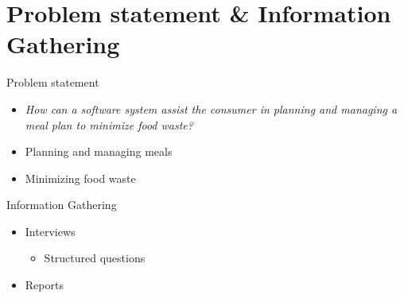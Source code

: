 \section{Problem statement \& Information Gathering} 
\begin{frame}{Problem statement}
    \begin{itemize}
        \item \textit{How can a software system assist the consumer in planning and managing a meal plan to minimize food waste?}
    \end{itemize}
        \begin{itemize}
            \item Planning and managing meals
            \item Minimizing food waste
        \end{itemize}
\end{frame}

\begin{frame}{Information Gathering}
    \begin{itemize}
        \item Interviews
        \begin{itemize}
        	\item Structured questions
        \end{itemize}
        \item Reports
    \end{itemize}
\end{frame}

